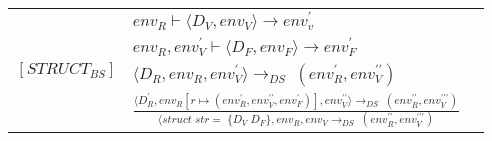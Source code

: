 


\begin{semantik}
    \bgroup
    \def\arraystretch{2}
    \begin{table}[H]
    \centering
    \begin{tabular}{l c l}
        
        \multirow{4}{*}{$[STRUCT_{BS}]$} &
        \multicolumn{1}{l}{$ env_R \vdash \langle D_V, env_V \rangle \rightarrow env_v^\prime$} \\
        
        & \multicolumn{1}{l}{$ env_R, env_V^\prime \vdash \langle D_F, env_F \rangle \rightarrow env_F^\prime $} \\
        
        & \multicolumn{1}{l}{$ \langle D_R, env_R, env_V^\prime \rangle \rightarrow_{DS}\;(env_R^\prime, env_V^{\prime\prime}) $} \\
        
        
        & \multicolumn{1}{l}{$ \frac
            {
              \langle D_R^\prime, env_R[r \mapsto (env_R^\prime, env_V^{\prime\prime}, env_F^\prime)], env_V^{\prime\prime} \rangle                                       \rightarrow_{DS}\;(env_R^{\prime\prime}, env_V^{\prime\prime\prime})
            }
            {
                \langle struct\;str =\;\{ D_V\;D_F \}, env_R, env_V \rightarrow_{DS}\;(env_R^{\prime\prime}, env_V^{\prime\prime\prime})
            } 
        $}
        
    \end{tabular}
    
    \end{table}
    \egroup
    \caption{Structs}
\label{sem:structs}
\end{semantik}

